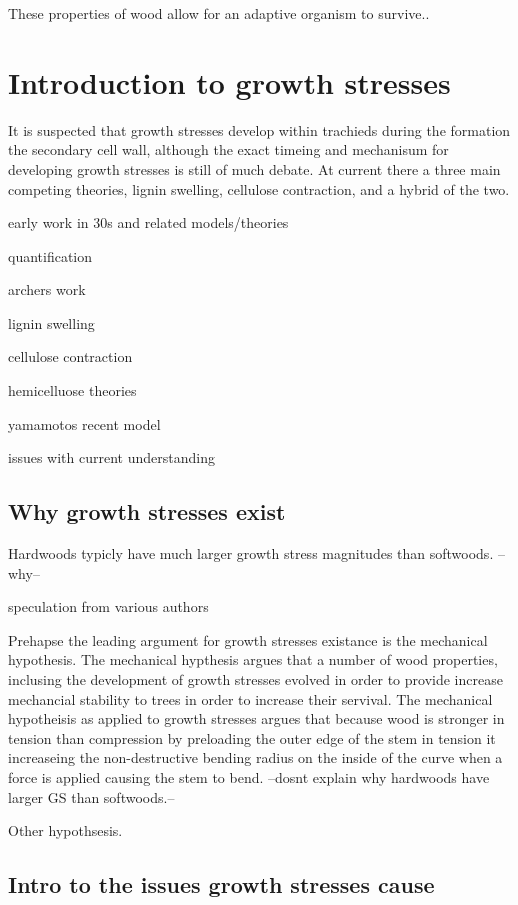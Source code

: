 \documentclass{article}
\begin{document}
These properties of wood allow for an adaptive organism to survive..

\section{Introduction to growth stresses}

It is suspected that growth stresses develop within trachieds during the
formation the secondary cell wall, although the exact timeing and mechanisum for
developing growth stresses is still of much debate. At current there a three
main competing theories, lignin swelling, cellulose contraction, and a hybrid of
the two.

early work in 30s and related models/theories

quantification

archers work

lignin swelling

cellulose contraction

hemicelluose theories

yamamotos recent model

issues with current understanding


\subsection{Why growth stresses exist}
Hardwoods typicly have much larger growth stress magnitudes than softwoods.
--why--

speculation from various authors

Prehapse the leading argument for growth stresses existance is the mechanical
hypothesis. The mechanical hypthesis argues that a number of wood properties,
inclusing the development of growth stresses evolved in order to provide
increase mechancial stability to trees in order to increase their servival. The
mechanical hypotheisis as applied to growth stresses argues that because wood is
stronger in tension than compression by preloading the outer edge of the stem
in tension it increaseing the non-destructive bending radius on the inside of
the curve when a force is applied causing the stem to bend. --dosnt explain why
hardwoods have larger GS than softwoods.--

Other hypothsesis.

\subsection{Intro to the issues growth stresses cause }
\end{document}
